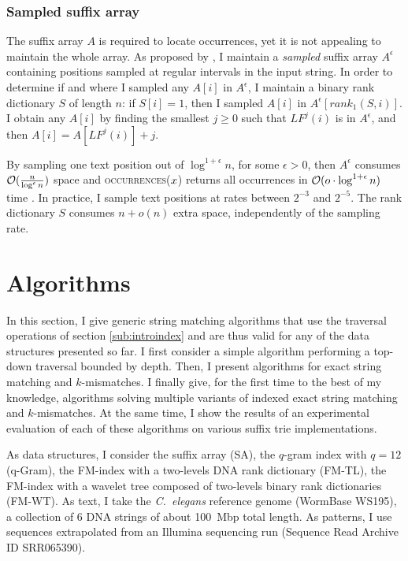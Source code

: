 \subsubsection{Sampled suffix array}

The suffix array $A$ is required to locate occurrences, yet it is not appealing to maintain the whole array.
As proposed by \citeauthor{Ferragina2000}, I maintain a \emph{sampled} suffix array $A^{\epsilon}$ containing positions sampled at regular intervals in the input string.
In order to determine if and where I sampled any $A[i]$ in $A^{\epsilon}$, I maintain a binary rank dictionary $S$ of length $n$: if $S[i]=1$, then I sampled $A[i]$ in $A^{\epsilon}[rank_1(S,i)]$.
I obtain any $A[i]$ by finding the smallest $j \geq 0$ such that $LF^j(i)$ is in $A^{\epsilon}$, and then $A[i] = A[LF^j(i)] + j$.

By sampling one text position out of $\log^{1+\epsilon}{n}$, for some $\epsilon > 0$, then $A^{\epsilon}$ consumes $\mathcal{O}(\frac{n}{\log^{\epsilon}{n}})$ space and \textsc{occurrences}($x$) returns all occurrences in $\mathcal{O}(o \cdot \log^{1+\epsilon}{n})$ time \citep{Ferragina2000}.
In practice, I sample text positions at rates between $2^{-3}$ and $2^{-5}$.
The rank dictionary $S$ consumes $n+o(n)$ extra space, independently of the sampling rate.

\section{Algorithms}
\label{sec:index:algo}

In this section, I give generic string matching algorithms that use the traversal operations of section \ref{sub:introindex} and are thus valid for any of the data structures presented so far.
I first consider a simple algorithm performing a top-down traversal bounded by depth.
Then, I present algorithms for exact string matching and $k$-mismatches.%
I finally give, for the first time to the best of my knowledge, algorithms solving multiple variants of indexed exact string matching and $k$-mismatches.
At the same time, I show the results of an experimental evaluation of each of these algorithms on various suffix trie implementations.

As data structures, I consider the suffix array (SA), the $q$-gram index with $q=12$ (q-Gram), the FM-index with a two-levels DNA rank dictionary (FM-TL), the FM-index with a wavelet tree composed of two-levels binary rank dictionaries (FM-WT).
As text, I take the \emph{C.~elegans} reference genome (WormBase WS195), \ie a collection of 6 DNA strings of about 100~Mbp total length.
As patterns, I use sequences extrapolated from an Illumina sequencing run (Sequence Read Archive ID SRR065390).

